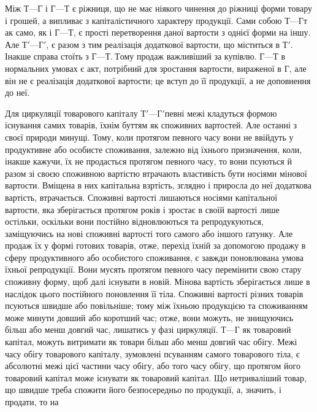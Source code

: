 Між $Т — Г$ і $Г — Т$ є ріжниця, що не має ніякого чинення до ріжниці
форми товару і грошей, а випливає з капіталістичного характеру
продукції. Сами собою $Т — Г т$ак само, як і $Г — Т$, є прості перетворення
даної вартости з однієї форми на іншу. Але $Т' — Г'$, є разом з тим
реалізація додаткової вартости, що міститься в $Т'$. Інакше справа стоїть з
$Г — Т.~Т$ому продаж важливіший за купівлю. $Г — Т$ в нормальних умовах
є акт, потрібний для зростання вартости, вираженої в Г, але він не є
реалізація додаткової вартости; це вступ до її продукції, а не доповнення
до неї.

Для циркуляції товарового капіталу $Т' — Г' п$евні межі кладуться
формою існування самих товарів, їхнім буттям як споживних вартостей.
Але останні з своєї природи минущі. Тому, коли протягом певного часу
вони не ввійдуть у продуктивне або особисте споживання, залежно від
їхнього призначення, коли, інакше кажучи, їх не продасться протягом
певного часу, то вони псуються й разом зі своєю споживною вартістю
втрачають властивість бути носіями мінової вартости. Вміщена в них
капітальна взртість, зглядно і приросла до неї додаткова вартість, втрачається.
Споживні вартості лишаються носіями капітальної вартости, яка
зберігається протягом років і зростає в своїй вартості лише остільки,
оскільки вони постійно відновлюються та репродукуються, заміщуючись
на нові споживні вартості того самого або іншого ґатунку. Але продаж
їх у формі готових товарів, отже, перехід їхній за допомогою продажу
в сферу продуктивного або особистого споживання, є завжди поновлювана
умова їхньої репродукції. Вони мусять протягом певного часу
перемінити свою стару споживну форму, щоб далі існувати в новій.
Мінова вартість зберігається лише в наслідок цього постійного поновлення
її тіла. Споживні вартості різних товарів псуються швидше
або повільніше; тому між їхньою продукцією та споживанням може
минути довший або коротший час; отже, вони можуть, не знищуючись
більш або менш довгий час, лишатись у фазі циркуляції. $Т — Г$
як товаровий капітал, можуть витримати як товари більш або менш
довгий час обігу. Межі часу обігу товарового капіталу, зумовлені псуванням
самого товарового тіла, є абсолютні межі цієї частини часу обігу,
або того часу обігу, що протягом його товаровий капітал може існувати
як товаровий капітал. Що нетриваліший товар, що швидше треба
спожити його безпосередньо по продукції, а, значить, і продати, то на
\parbreak{}  %
